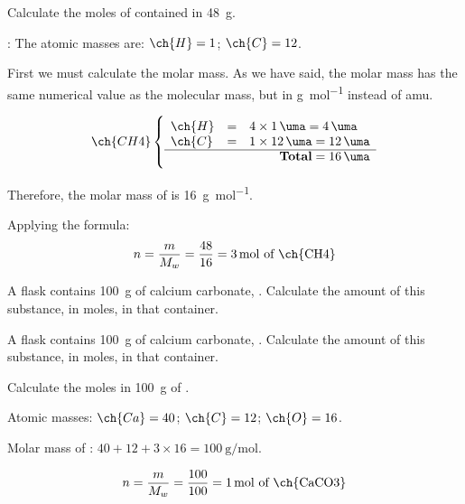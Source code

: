 \begin{example}{}

    Calculate the moles of  contained in \qty{48}{\g}.

    \datos{}: The atomic masses are: \( \ch{H} = 1 \); \( \ch{C} = 12 \).

    First we must calculate the molar mass. As we have said, the molar mass has the same numerical value as the molecular mass, but in \unit{\g\per\mole} instead of amu.

    \[
        \ch{CH4} \left\{\rule{0pt}{0.8cm}
                     \begin{array}{lcl}
                         \ch{H} &=& 4 \times \qty{1}{\uma} = \qty{4}{\uma} \\
                         \ch{C} &=& 1 \times \qty{12}{\uma} = \qty{12}{\uma} \\
                         \cline{1-3}
                         \multicolumn{3}{r}{\textbf{Total} = \qty{16}{\uma} }
                     \end{array}
        \right.
    \]

    Therefore, the molar mass of  is \qty{16}{\g\per\mole}.

    Applying the formula:
    \begin{equation*}
        n = \dfrac{m}{M_w} = \dfrac{48}{16} = \qty{3}{\mole} \text{ of \ch{CH4}}
    \end{equation*}
\end{example}



\begin{exercise}
    A flask contains \qty{100}{\g} of calcium carbonate, . Calculate the amount of this substance, in moles, in that container.
    \begin{solu}
        A flask contains \qty{100}{\g} of calcium carbonate, . Calculate the amount of this substance, in moles, in that container.

        Calculate the moles in \qty{100}{\g} of .

        Atomic masses: \( \ch{Ca} = 40 \); \( \ch{C} = 12 \); \( \ch{O} = 16 \).

        Molar mass of : \( 40 + 12 + 3 \times 16 = \qty{100}{\g\per\mole} \).

        \begin{equation*}
            n = \dfrac{m}{M_w} = \dfrac{100}{100} = \qty{1}{\mole} \text{ of \ch{CaCO3}}
        \end{equation*}
    \end{solu}
\end{exercise}

